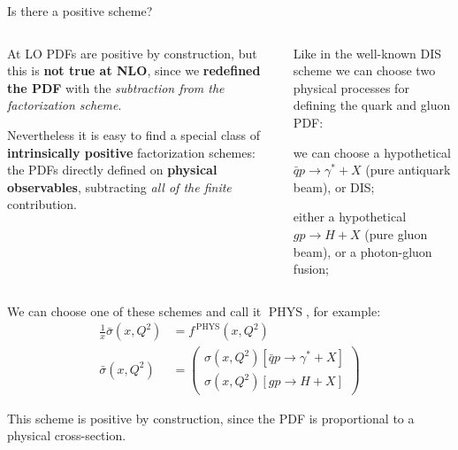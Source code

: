 \documentclass[8pt]{beamer}
\DeclareMathOperator{\phys}{PHYS}
\begin{document}
\begin{frame}{Is there a positive scheme?}
    \begin{columns}
        \begin{column}{0.55\textwidth}
            At LO PDFs are positive by construction, but this is \textbf{not
            true at NLO}, since we \textbf{redefined the PDF} with the
            \textit{subtraction from the factorization scheme}.
            \newline

            Nevertheless it is easy to find a special class of
            \textbf{intrinsically positive} factorization schemes:
            the PDFs directly defined on \textbf{physical observables},
            subtracting \textit{all of the finite} contribution.
        \end{column}

        \begin{column}{0.45\textwidth}
            Like in the well-known DIS scheme we can choose two physical
            processes for defining the quark and gluon PDF:
            \begin{description}[style=unboxed]
                \item[quark] we can choose a hypothetical $\bar{q} p \to
                    \gamma^* + X$ (pure antiquark beam), or DIS;
                \item[gluon] either a hypothetical $g p \to H + X$ (pure gluon
                    beam), or a photon-gluon fusion;
            \end{description}
        \end{column}
    \end{columns}

    \vspace*{30pt}
    We can choose one of these schemes and call it $\phys$, for example:
    \begin{align*}
        \frac{1}{x}\bar{\sigma}(x,Q^2) &= f^{\,\phys}(x,Q^2)\\
        \bar{\sigma}(x,Q^2) &= \begin{pmatrix}
        \sigma(x,Q^2)[\bar{q} p \to \gamma^* + X]\\
        \sigma(x,Q^2)[g p \to H + X]
        \end{pmatrix}
    \end{align*}

    This scheme is positive by construction, since the PDF is proportional to a
    physical cross-section.
\end{frame}
\end{document}

